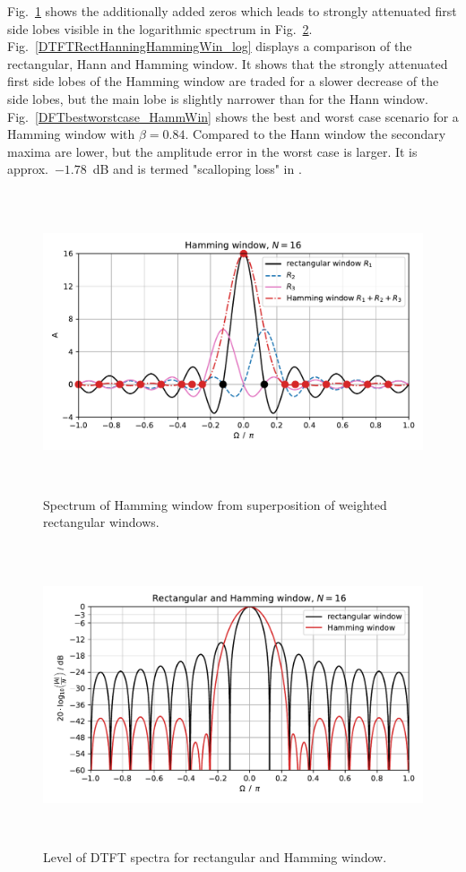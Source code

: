 \documentclass[11pt,a4paper,DIV=12]{scrartcl}
\begin{document}
Fig.~\ref{HammingausRectWindow} shows the additionally added zeros which leads
to strongly attenuated first side lobes visible in the logarithmic spectrum in
Fig.~\ref{DTFTHammingWin_log}.
%
Fig.~\ref{DTFTRectHanningHammingWin_log} displays a comparison of the
rectangular, Hann and Hamming window.
%
It shows that the strongly attenuated first side lobes of the Hamming window
are traded for a slower decrease of the side lobes, but the main lobe is
slightly narrower than for the Hann window.
%
Fig.~\ref{DFTbestworstcase_HammWin} shows the best and worst case scenario for
a Hamming window with $\beta=0.84$.
%
Compared to the Hann window the secondary maxima are lower, but the
amplitude error in the worst case is larger.
%
It is approx.~$-1.78$~dB and is termed "scalloping loss" in \cite{Harris1978}.
\begin{figure}
		\centering
		\includegraphics[width=6in, height=3.5in]{graphics/Hamming_from_RectWindow.pdf}
		\caption{Spectrum of Hamming window from superposition of weighted
		rectangular windows.}
		\label{HammingausRectWindow}
\end{figure}
\begin{figure}
		\centering
		\includegraphics[width=6in, height=3.5in]{graphics/DTFTHammingWin_log.pdf}
		\caption{Level of DTFT spectra for rectangular and Hamming window.}
		\label{DTFTHammingWin_log}
\end{figure}
\end{document}

